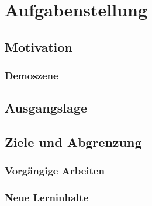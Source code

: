 
\chapter{Aufgabenstellung}
\label{chap:scope}

\section{Motivation}
\label{sec:motivation}

\subsection{Demoszene}
\label{subsec:demoscene}

\section{Ausgangslage}
\label{sec:initial_situation}

\section{Ziele und Abgrenzung}
\label{sec:objectives}

\subsection{Vorgängige Arbeiten}
\label{subsec:preliminaries}

\subsection{Neue Lerninhalte}
\label{subsec:new_learning_contents}
